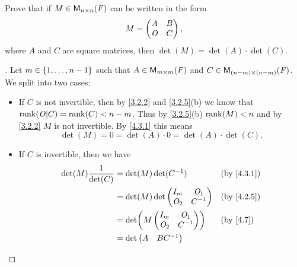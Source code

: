 \begin{ex}\label{ex:4.3.21}
  Prove that if \(M \in \ms[n][n][\F]\) can be written in the form
  \[
    M = \begin{pmatrix}
      A   & B \\
      \mathit{O} & C
    \end{pmatrix},
  \]
  where \(A\) and \(C\) are square matrices, then \(\det(M) = \det(A) \cdot \det(C)\).
\end{ex}

\begin{proof}[]
  Let \(m \in \left\lbrace1, \dots, n - 1\right\rbrace\) such that \(A \in \ms[m][m][\F]\) and \(C \in \ms[(n - m)][(n - m)][\F]\).
  We split into two cases:
  \begin{itemize}
    \item If \(C\) is not invertible, then by \cref{3.2.2} and \cref{3.2.5}(b) we know that \(\rk{\zm | C} = \rk{C} < n - m\).
          Thus by \cref{3.2.5}(b) \(\rk{M} < n\) and by \cref{3.2.2} \(M\) is not invertible.
          By \cref{4.3.1} this means
          \[
            \det(M) = 0 = \det(A) \cdot 0 = \det(A) \cdot \det(C).
          \]
    \item If \(C\) is invertible, then we have
          \begin{align*}
            \det(M) \frac{1}{\det(C)} & = \det(M) \det(C^{-1})        &  & \by{4.3.1}     \\
                                      & = \det(M) \det\begin{pmatrix}
                                                        I_m   & \zm_1  \\
                                                        \zm_2 & C^{-1}
                                                      \end{pmatrix} &  & \by{4.2.5}       \\
                                      & = \det\pa{M \begin{pmatrix}
                                                        I_m   & \zm_1  \\
                                                        \zm_2 & C^{-1}
                                                      \end{pmatrix}}   &  & \by{4.7}        \\
                                      & = \det\begin{pmatrix}
                                                A   & BC^{-1} \\

\end{pmatrix}
\end{align*}
\end{itemize}
\end{proof}
